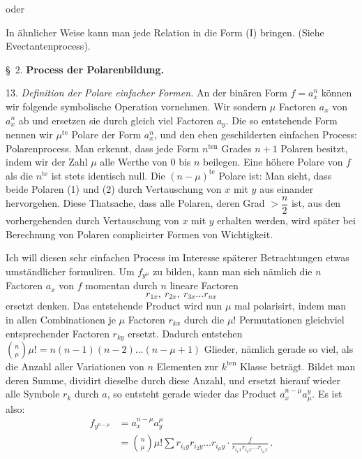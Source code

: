 oder


In ähnlicher Weise kann man jede Relation in die Form (I) bringen.
(Siehe Evectantenprocess).



\begin{center}
\S~2. \textbf{Process der Polarenbildung.}
\end{center}

13. \textit{Definition der Polare einfacher Formen.} An der binären Form $f=a_x^n$ können wir folgende symbolische Operation vornehmen. Wir sondern $\mu$ Factoren $a_x$ von $a_x^n$ ab und ersetzen sie durch gleich viel Factoren $a_y$. Die so entstehende Form
nennen wir $\mu^{\text{te}}$ Polare der Form $a_x^n$, und den eben geschilderten einfachen Process: Polarenprocess. Man erkennt, dass jede Form $n^{\text{ten}}$ Grades $n+1$ Polaren besitzt, indem wir der Zahl $\mu$ alle Werthe von 0 bis $n$ beilegen. Eine höhere Polare von $f$ als die $n^{\text{te}}$ ist stets identisch null. Die $(n-\mu)^{\text{te}}$ Polare ist:
Man sieht, dass beide Polaren (1) und (2) durch Vertauschung von $x$ mit $y$ aus einander hervorgehen. Diese Thatsache, dass alle Polaren, deren Grad $>\dfrac{n}{2}$ ist, aus den vorhergehenden durch Vertauschung von $x$ mit $y$ erhalten werden, wird später bei Berechnung von Polaren complicirter Formen von Wichtigkeit.

Ich will diesen sehr einfachen Process im Interesse späterer Betrachtungen etwas umständlicher formuliren. Um $f_{y^\mu}$ zu bilden, kann man sich nämlich die $n$ Factoren $a_x$ von $f$ momentan durch $n$ lineare Factoren
\[ r_{1x},\ r_{2x},\ r_{3x}\ldots r_{nx} \]
ersetzt denken. Das entstehende Product wird nun $\mu$ mal polarisirt, indem man in allen Combinationen je $\mu$ Factoren $r_{kx}$ durch die $\mu!$ Permutationen gleichviel entsprechender Factoren $r_{ky}$ ersetzt. Dadurch entstehen $\binom{n}{\mu}\mu! = n(n-1)(n-2)\ldots(n-\mu+1)$ Glieder, nämlich gerade so viel, als die Anzahl aller Variationen von $n$ Elementen zur $k^{\text{ten}}$ Klasse beträgt. Bildet man deren Summe, dividirt dieselbe durch diese Anzahl, und ersetzt hierauf wieder alle Symbole $r_k$ durch $a$, so entsteht gerade wieder das Product $a_x^{n-\mu}a_\mu^y$. Es ist also: %
\[
\begin{aligned}
f_{y^{n-\mu}} &= a_x^{n-\mu}a_y^\mu\\
&= \binom{n}{\mu}\mu!\sum r_{i_1y}r_{i_2y}\ldots r_{i_\mu y}\cdot\frac{f}{r_{i_1x}r_{i_2x}\ldots r_{i_\mu x}}\,.
\end{aligned}
\]

